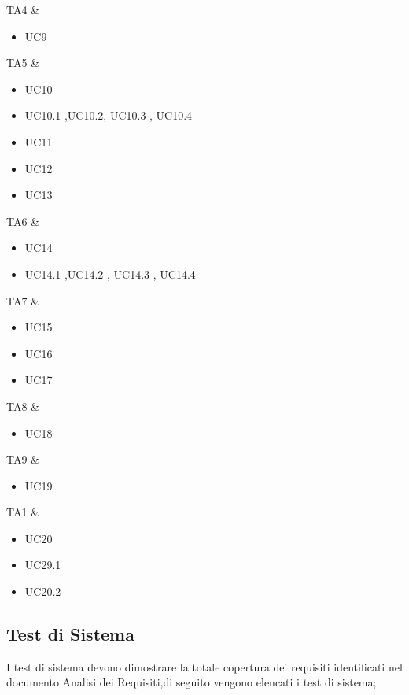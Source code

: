     
    TA4 & \begin{itemize}
        \item UC9
    \end{itemize}

    
    TA5 & \begin{itemize}
        \item UC10
        \item UC10.1 ,UC10.2, UC10.3 , UC10.4
        \item UC11
        \item UC12
        \item UC13
    \end{itemize}

    
    TA6 & \begin{itemize}
        \item UC14
        \item UC14.1 ,UC14.2 , UC14.3 , UC14.4
    \end{itemize}

    
    TA7 & \begin{itemize}
        \item UC15
        \item UC16
        \item UC17
    \end{itemize}

    
    TA8 & \begin{itemize}
        \item UC18
    \end{itemize}

    
    TA9 & \begin{itemize}
        \item UC19
    \end{itemize}

    TA1 & \begin{itemize}
        \item UC20
        \item UC29.1
        \item UC20.2
    \end{itemize}

\subsection{Test di Sistema}
I test di sistema devono dimostrare la totale copertura dei requisiti identificati nel documento Analisi dei Requisiti,di seguito vengono elencati i test di sistema;


